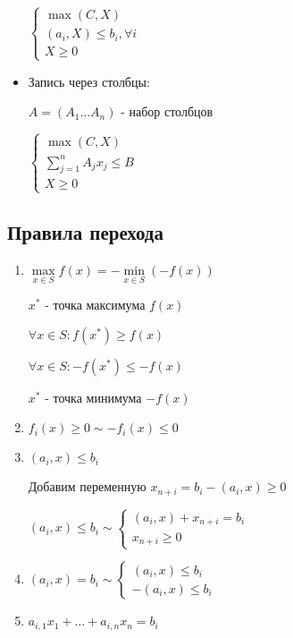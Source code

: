 \documentclass[11pt]{article}
\begin{document}
\begin{sloppypar}
\begin{itemize}
$\begin{cases}
  \max (C, X) \\
  (a_i, X) \leq b_i, \forall i \\
  X \geq 0
\end{cases}$

\item Запись через столбцы:

$A = (A_1 \dots A_n)$ - набор столбцов

$\begin{cases}
  \max (C, X) \\
  \sum_{j = 1}^n A_j x_j \leq B \\
  X \geq 0
\end{cases}$
\end{itemize}

\subsection*{Правила перехода}
\begin{enumerate}
  \item $\max\limits_{x \in S} f(x) = - \min\limits_{x \in S} (- f(x))$
  
    $x^*$ - точка максимума $f(x)$
  
    $\forall x \in S: f(x^*) \geq f(x)$
  
    $\forall x \in S: - f(x^*) \leq - f(x)$
  
    $x^*$ - точка минимума $- f(x)$
  
  \item $f_i(x) \geq 0 \sim - f_i(x) \leq 0$
  
  \item $(a_i, x) \leq b_i$
  
    Добавим переменную $x_{n + i} = b_i - (a_i, x) \geq 0$
    
    $(a_i, x) \leq b_i \sim
    \begin{cases}
      (a_i, x) + x_{n + i} = b_i \\
      x_{n + i} \geq 0    
    \end{cases}$
    
  \item $(a_i, x) = b_i \sim
    \begin{cases}
      (a_i, x) \leq b_i \\
      - (a_i, x) \leq b_i
    \end{cases}$
    
  \item $a_{i, 1}x_1 + \dots + a_{i, n}x_n = b_i$
  

\end{enumerate}
\end{sloppypar}
\end{document}
